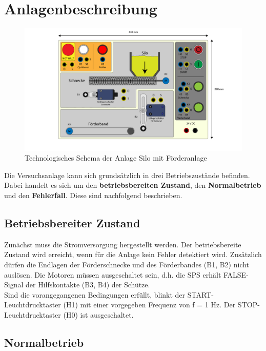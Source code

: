 \documentclass[
	pagesize,
	fontsize=12pt,
	paper=a4,
	oneside,
   reqno
]{scrartcl}
\begin{document}
\section{Anlagenbeschreibung}

\begin{figure}[H]
   \centering
   \includegraphics[width=1.0\textwidth]{Bilder/Aufbauplan_Vorderseite.pdf}
   \caption[Technologieschema]{Technologisches Schema der Anlage \glqq Silo mit Förderanlage\grqq{}}
   \label{fig:Bild1}
\end{figure}

Die Versuchsanlage kann sich grundsätzlich in drei Betriebszustände befinden. Dabei handelt es sich um den \textbf{betriebsbereiten Zustand}, den \textbf{Normalbetrieb} und den \textbf{Fehlerfall}. Diese sind nachfolgend beschrieben.

\subsection{Betriebsbereiter Zustand}

Zunächst muss die Stromversorgung hergestellt werden. Der betriebsbereite Zustand wird erreicht, wenn für die Anlage kein Fehler detektiert wird. Zusätzlich dürfen die Endlagen der Förderschnecke und des Förderbandes (B1, B2) nicht auslösen. Die Motoren müssen ausgeschaltet sein, d.h. die SPS erhält FALSE-Signal der Hilfskontakte (B3, B4) der Schütze.\\
Sind die vorangegangenen Bedingungen erfüllt, blinkt der START-Leuchtdrucktaster (H1) mit einer vorgegeben Frequenz von f = 1 Hz. Der STOP-Leuchtdrucktaster (H0) ist ausgeschaltet.

\subsection{Normalbetrieb}
\end{document}
